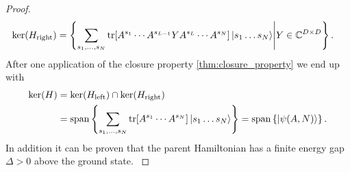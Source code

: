 \begin{proof}
\begin{align}
	\mathrm{ker}(H_{\mathrm{right}}) &= \left\{ \sum_{s_1, \ldots, s_N} \tr[A^{s_1} \cdots A^{s_{L-1}} Y A^{s_L} \cdots A^{s_N}] \ket{s_1 \ldots s_N} \middle\vert Y \in \mathbb{C}^{D \times D} \right\}.	
\end{align}
After one application of the closure property \ref{thm:closure_property} we end up with
\begin{align}
\begin{split}
	\mathrm{ker}(H) &= \mathrm{ker}(H_{\mathrm{left}}) \cap \mathrm{ker}(H_{\mathrm{right}}) \\
	&= \mathrm{span} \left\{ \sum_{s_1, \ldots, s_N} \tr[A^{s_1} \cdots A^{s_N}] \ket{s_1 \ldots s_N} \right\} 
	= \mathrm{span}\left\{\ket{\psi(A,N)}\right\}.
\end{split}
\end{align}
In addition it can be proven that the parent Hamiltonian has a finite energy gap $\Delta > 0$ above the ground state. \cite{perez2007matrix, schuch2010peps}
\end{proof}